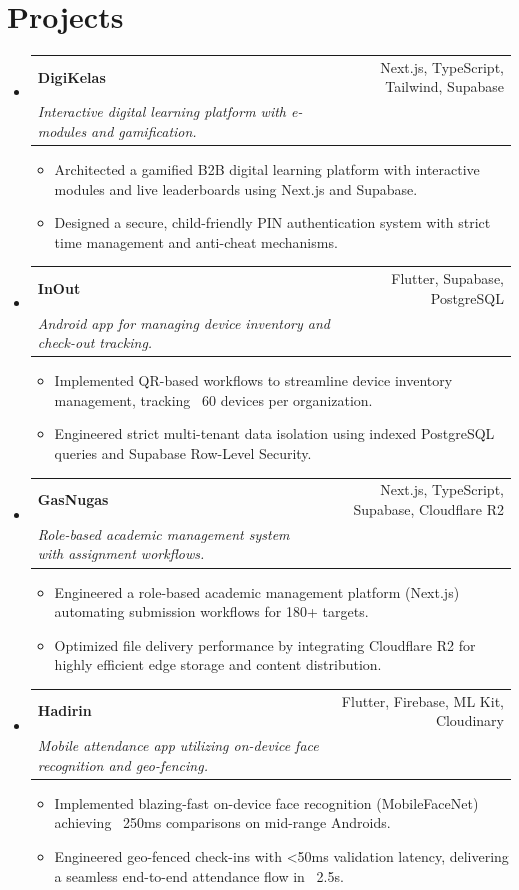 \documentclass[a4paper,10pt]{article}
\makeatletter
\newcommand{\resumeSubheading}[4]{
  \vspace{-1pt}\item
    \begin{tabular*}{0.97\textwidth}[t]{l@{\extracolsep{\fill}}r}
      \textbf{#1} & #2 \\
      \textit{\small #3} & \textit{\small #4} \\
    \end{tabular*}\vspace{-5pt}
}
\newcommand{\resumeItemPlain}[1]{
  \item\small{
    {#1 \vspace{-2pt}}
  }
}
\newcommand{\resumeSubHeadingListStart}{\begin{itemize}[leftmargin=*]}
\newcommand{\resumeSubHeadingListEnd}{\end{itemize}}
\newcommand{\resumeItemListStart}{\begin{itemize}}
\newcommand{\resumeItemListEnd}{\end{itemize}\vspace{-5pt}}
\makeatother
\begin{document}
\section{Projects}
  \resumeSubHeadingListStart
    \resumeSubheading
      {DigiKelas}{Next.js, TypeScript, Tailwind, Supabase}
      {Interactive digital learning platform with e-modules and gamification.}{}
      \resumeItemListStart
        \resumeItemPlain{Architected a gamified B2B digital learning platform with interactive modules and live leaderboards using Next.js and Supabase.}
        \resumeItemPlain{Designed a secure, child-friendly PIN authentication system with strict time management and anti-cheat mechanisms.}
      \resumeItemListEnd
      \vspace{3pt}

    \resumeSubheading
      {InOut}{Flutter, Supabase, PostgreSQL}
      {Android app for managing device inventory and check-out tracking.}{}
      \resumeItemListStart
        \resumeItemPlain{Implemented QR-based workflows to streamline device inventory management, tracking ~60 devices per organization.}
        \resumeItemPlain{Engineered strict multi-tenant data isolation using indexed PostgreSQL queries and Supabase Row-Level Security.}
      \resumeItemListEnd
      \vspace{3pt}

    \resumeSubheading
      {GasNugas}{Next.js, TypeScript, Supabase, Cloudflare R2}
      {Role-based academic management system with assignment workflows.}{}
      \resumeItemListStart
        \resumeItemPlain{Engineered a role-based academic management platform (Next.js) automating submission workflows for 180+ targets.}
        \resumeItemPlain{Optimized file delivery performance by integrating Cloudflare R2 for highly efficient edge storage and content distribution.}
      \resumeItemListEnd
      \vspace{3pt}

    \resumeSubheading
      {Hadirin}{Flutter, Firebase, ML Kit, Cloudinary}
      {Mobile attendance app utilizing on-device face recognition and geo-fencing.}{}
      \resumeItemListStart
        \resumeItemPlain{Implemented blazing-fast on-device face recognition (MobileFaceNet) achieving ~250ms comparisons on mid-range Androids.}
        \resumeItemPlain{Engineered geo-fenced check-ins with <50ms validation latency, delivering a seamless end-to-end attendance flow in ~2.5s.}
      \resumeItemListEnd
  \resumeSubHeadingListEnd

\end{document}
